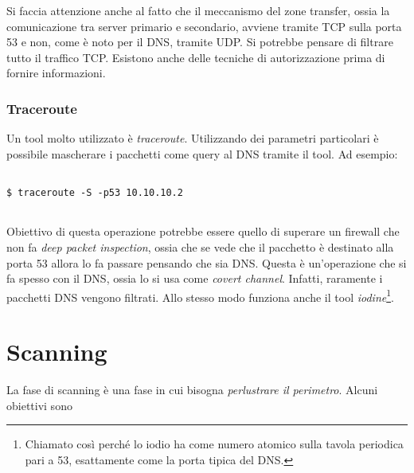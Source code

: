 \documentclass[14pt]{extreport}
\begin{document}
\vspace{5pt}

Si faccia attenzione anche al fatto che il meccanismo del zone transfer, ossia la comunicazione tra server primario e secondario, avviene tramite TCP sulla porta 53 e non, come è noto per il DNS, tramite UDP. Si potrebbe pensare di filtrare tutto il traffico TCP. Esistono anche delle tecniche di autorizzazione prima di fornire informazioni.

\subsection{Traceroute}
Un tool molto utilizzato è \textit{traceroute}. Utilizzando dei parametri particolari è possibile mascherare i pacchetti come query al DNS tramite il tool. Ad esempio:

\vspace{5pt}

{
\small
\begin{tcolorbox}

\begin{verbatim}

$ traceroute -S -p53 10.10.10.2
  
\end{verbatim}

\end{tcolorbox}
}

\vspace{5pt}
Obiettivo di questa operazione potrebbe essere quello di superare un firewall che non fa \textit{deep packet inspection}, ossia che se vede che il pacchetto è destinato alla porta 53 allora lo fa passare pensando che sia DNS.
Questa è un'operazione che si fa spesso con il DNS, ossia lo si usa come \textit{covert channel}. Infatti, raramente i pacchetti DNS vengono filtrati. Allo stesso modo funziona anche il tool \textit{iodine}\footnote{Chiamato così perché lo iodio ha come numero atomico sulla tavola periodica pari a 53, esattamente come la porta tipica del DNS.}.




















\chapter{Scanning}
La fase di scanning è una fase in cui bisogna \textit{perlustrare il perimetro}. Alcuni obiettivi sono
\end{document}
